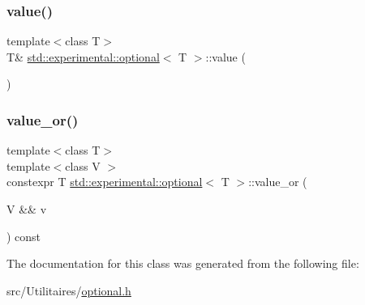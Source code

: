 \mbox{\label{classstd_1_1experimental_1_1optional_a2278733d39a8c6b6c032f080b5ca0644}} 
\subsubsection{\texorpdfstring{value()}{value()}\hspace{0.1cm}{\footnotesize\ttfamily [2/2]}}
{\footnotesize\ttfamily template$<$class T$>$ \\
T\& \mbox{\hyperlink{classstd_1_1experimental_1_1optional}{std\+::experimental\+::optional}}$<$ T $>$\+::value (\begin{DoxyParamCaption}{ }\end{DoxyParamCaption})\hspace{0.3cm}{\ttfamily [inline]}}

\mbox{\label{classstd_1_1experimental_1_1optional_a7556c77490cf4fc004291fc7c6696967}} 
\subsubsection{\texorpdfstring{value\+\_\+or()}{value\_or()}}
{\footnotesize\ttfamily template$<$class T$>$ \\
template$<$class V $>$ \\
constexpr T \mbox{\hyperlink{classstd_1_1experimental_1_1optional}{std\+::experimental\+::optional}}$<$ T $>$\+::value\+\_\+or (\begin{DoxyParamCaption}\item[{V \&\&}]{v }\end{DoxyParamCaption}) const\hspace{0.3cm}{\ttfamily [inline]}}



The documentation for this class was generated from the following file\+:\begin{DoxyCompactItemize}
\item 
src/\+Utilitaires/\mbox{\hyperlink{optional_8h}{optional.\+h}}\end{DoxyCompactItemize}
